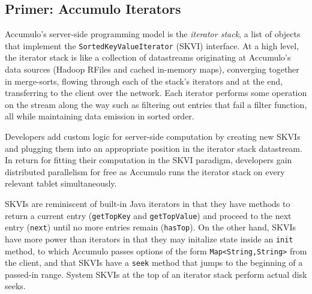








\subsection{Primer: Accumulo Iterators}
\label{sAccumuloIterators}
Accumulo's server-side programming model is the %
\emph{iterator stack}, a list of objects that implement the \texttt{SortedKeyValueIterator} (SKVI) interface.
At a high level, the iterator stack is like a collection of datastreams originating
at Accumulo's data sources (Hadoop RFiles and cached in-memory maps), converging together in merge-sorts,
flowing through each of the stack's iterators and at the end, transferring to the client over the network.
Each iterator performs some operation on the stream along the way such as filtering out entries that
fail a filter function, all while maintaining data emission in sorted order.

Developers add custom logic for server-side computation
by creating new SKVIs and plugging them into an appropriate position in the iterator stack datastream.
In return for fitting their computation in the SKVI paradigm, developers gain
distributed parallelism for free as Accumulo runs the iterator stack on every relevant tablet simultaneously.


SKVIs are reminiscent of built-in Java iterators %
in that they have methods to return a current entry (\texttt{getTopKey} and \texttt{getTopValue})
and proceed to the next entry (\texttt{next}) until no more entries remain (\texttt{hasTop}).
On the other hand, SKVIs have more power than iterators in that they may initalize state
inside an \texttt{init} method, to which Accumulo passes
options of the form \texttt{Map<String,String>} from the client,
and that SKVIs have a \texttt{seek} method that jumps to the beginning of a passed-in range. 
System SKVIs at the top of an iterator stack perform actual disk seeks.%

